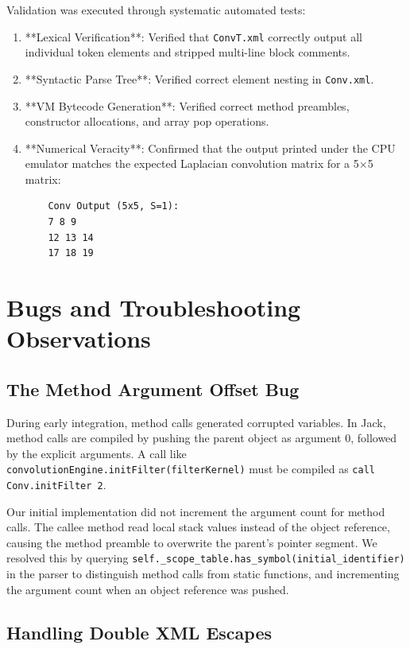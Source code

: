 \documentclass[11pt,a4paper]{article}
\begin{document}
Validation was executed through systematic automated tests:
\begin{enumerate}
    \item **Lexical Verification**: Verified that \texttt{ConvT.xml} correctly output all individual token elements and stripped multi-line block comments.
    \item **Syntactic Parse Tree**: Verified correct element nesting in \texttt{Conv.xml}.
    \item **VM Bytecode Generation**: Verified correct method preambles, constructor allocations, and array pop operations.
    \item **Numerical Veracity**: Confirmed that the output printed under the CPU emulator matches the expected Laplacian convolution matrix for a 5$\times$5 matrix:
    \begin{verbatim}
    Conv Output (5x5, S=1):
    7 8 9
    12 13 14
    17 18 19
    \end{verbatim}
\end{enumerate}

\section{Bugs and Troubleshooting Observations}

\subsection{The Method Argument Offset Bug}

During early integration, method calls generated corrupted variables. In Jack, method calls are compiled by pushing the parent object as argument 0, followed by the explicit arguments. A call like \texttt{convolutionEngine.initFilter(filterKernel)} must be compiled as \texttt{call Conv.initFilter 2}. 

Our initial implementation did not increment the argument count for method calls. The callee method read local stack values instead of the object reference, causing the method preamble to overwrite the parent's pointer segment. We resolved this by querying \texttt{self._scope_table.has_symbol(initial_identifier)} in the parser to distinguish method calls from static functions, and incrementing the argument count when an object reference was pushed.

\subsection{Handling Double XML Escapes}
\end{document}
